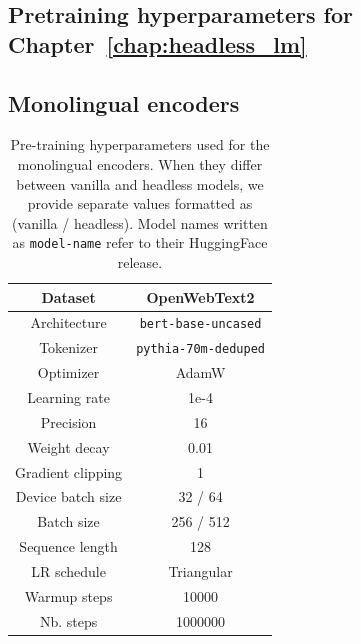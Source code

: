 \begin{appendices}
\clearpage

\section{Pretraining hyperparameters for Chapter~\ref{chap:headless_lm}}
\label{app:train_hp}

\subsection{Monolingual encoders}
\label{app:train_mono_enc}
\begin{table}[H]
\centering
\small
\begin{tabular}{c|c}
\toprule
Dataset & OpenWebText2  \\ \hline
Architecture & \texttt{bert-base-uncased} \\ \hline
Tokenizer & \texttt{pythia-70m-deduped} \\ \hline
Optimizer         & AdamW      \\ \hline
Learning rate     & 1e-4       \\ \hline
Precision  & 16 \\ \hline
Weight decay      & 0.01       \\ \hline
Gradient clipping & 1          \\ \hline
Device batch size        & 32 / 64         \\ \hline
Batch size        & 256 / 512         \\ \hline
Sequence length   & 128        \\ \hline
LR schedule       & Triangular \\ \hline
Warmup steps      & 10000      \\ \hline
Nb. steps         & 1000000        \\ \bottomrule
\end{tabular}
\caption{Pre-training hyperparameters used for the monolingual encoders. When they differ between vanilla and headless models, we provide separate values formatted as (vanilla / headless). Model names written as \texttt{model-name} refer to their HuggingFace release.}
\end{table}


\end{appendices}
